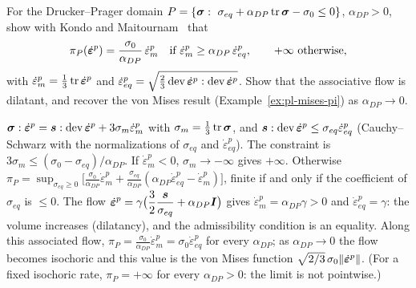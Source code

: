 \label{exo:pl-dp}
%
For the Drucker--Prager domain
$P=\{\sig:\ \sigma_{eq}+\alpha_{DP}\tr\sig-\sigma_0\le0\}$, $\alpha_{DP}>0$,
show with Kondo and Maitournam~\cite{KondoMaitournam2023} that
\[
  \pi_P(\dot{\bm{\varepsilon}}^p)=\frac{\sigma_0}{\alpha_{DP}}\,\dot\varepsilon^p_m\quad\text{if }
  \dot\varepsilon^p_m\ge\alpha_{DP}\,\dot\varepsilon^p_{eq},\qquad +\infty\ \text{otherwise},
\]
with $\dot\varepsilon^p_m=\tfrac13\operatorname{tr}\dot{\bm{\varepsilon}}^p$ and
$\dot\varepsilon^p_{eq}=\sqrt{\tfrac23\operatorname{dev}\dot{\bm{\varepsilon}}^p:\operatorname{dev}\dot{\bm{\varepsilon}}^p}$. Show that
the associative flow is dilatant, and recover the von Mises result
(Example~\ref{ex:pl-mises-pi}) as $\alpha_{DP}\to0$.
\begin{solution}
$\bm{\sigma}:\dot{\bm{\varepsilon}}^p=\bm{s}:\operatorname{dev}\dot{\bm{\varepsilon}}^p+3\sigma_m\dot\varepsilon^p_m$ with
$\sigma_m=\tfrac13\operatorname{tr}\bm{\sigma}$, and $\bm{s}:\operatorname{dev}\dot{\bm{\varepsilon}}^p\le\sigma_{eq}\dot\varepsilon^p_{eq}$
(Cauchy--Schwarz with the normalizations of $\sigma_{eq}$ and $\dot\varepsilon^p_{eq}$).
The constraint is $3\sigma_m\le(\sigma_0-\sigma_{eq})/\alpha_{DP}$. If
$\dot\varepsilon^p_m<0$, $\sigma_m\to-\infty$ gives $+\infty$. Otherwise
$\displaystyle \pi_P=\sup_{\sigma_{eq}\ge0}\bigl[\frac{\sigma_0}{\alpha_{DP}}\dot\varepsilon^p_m
+\frac{\sigma_{eq}}{\alpha_{DP}}(\alpha_{DP}\dot\varepsilon^p_{eq}-\dot\varepsilon^p_m)\bigr]$,
finite if and only if the coefficient of $\sigma_{eq}$ is $\le0$. The flow
$\displaystyle \dot{\bm{\varepsilon}}^p=\gamma\bigl(\frac32\frac{\bm{s}}{\sigma_{eq}}+\alpha_{DP}\bm{I}\bigr)$
gives $\dot\varepsilon^p_m=\alpha_{DP}\gamma>0$ and
$\dot\varepsilon^p_{eq}=\gamma$: the volume increases (dilatancy), and the
admissibility condition is an equality. Along this associated flow,
$\displaystyle \pi_P=\frac{\sigma_0}{\alpha_{DP}}\dot\varepsilon^p_m=\sigma_0\dot\varepsilon^p_{eq}$
for every $\alpha_{DP}$; as $\alpha_{DP}\to0$ the flow becomes isochoric and this
value is the von Mises function $\sqrt{2/3}\,\sigma_0\lVert \dot{\bm{\varepsilon}}^p\rVert$. (For a
fixed isochoric rate, $\pi_P=+\infty$ for every $\alpha_{DP}>0$: the limit is
not pointwise.)
\end{solution}


